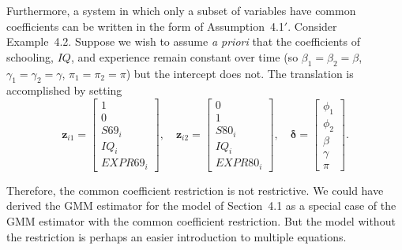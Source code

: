 Furthermore, a system in which only a subset of variables have common coefficients
can be written in the form of Assumption~4.1$'$. Consider Example~4.2.
Suppose we wish to assume \textit{a priori} that the coefficients of schooling, $IQ$, and
experience remain constant over time (so $\beta_1 = \beta_2 = \beta$,
$\gamma_1 = \gamma_2 = \gamma$, $\pi_1 = \pi_2 = \pi$) but the intercept does not.
The translation is accomplished by setting
\begin{equation}
\mathbf{z}_{i1} = \begin{bmatrix} 1 \\ 0 \\ S69_i \\ IQ_i \\ EXPR69_i \end{bmatrix}, \quad
\mathbf{z}_{i2} = \begin{bmatrix} 0 \\ 1 \\ S80_i \\ IQ_i \\ EXPR80_i \end{bmatrix}, \quad
\boldsymbol{\delta} = \begin{bmatrix} \phi_1 \\ \phi_2 \\ \beta \\ \gamma \\ \pi \end{bmatrix}.
\label{eq:4.6.19}
\end{equation}

Therefore, the common coefficient restriction is not restrictive. We could have
derived the GMM estimator for the model of Section~4.1 as a special case of the
GMM estimator with the common coefficient restriction. But the model without
the restriction is perhaps an easier introduction to multiple equations.

